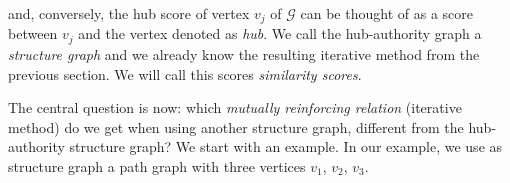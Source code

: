 \documentclass[a4paper,11pt]{report}
\newcommand{\graf}{\mathscr{G}}
\begin{document}
\begin{center}
\end{center}
and, conversely, the hub score of vertex $v_j$ of $\graf$ can be thought of as a 
score between $v_j$ and the vertex denoted as \emph{hub}. We call the hub-authority graph a 
\emph{structure graph} and we already know the resulting iterative method from the previous section. 
We will call this scores \emph{similarity scores}.

The central question is now: which \emph{mutually reinforcing relation} (iterative method) do we get when using another structure graph, 
different from the hub-authority structure graph? 
We start with an example. In our example, we use as structure graph a path graph with three vertices $v_1$, $v_2$, $v_3$. 
\end{document}
